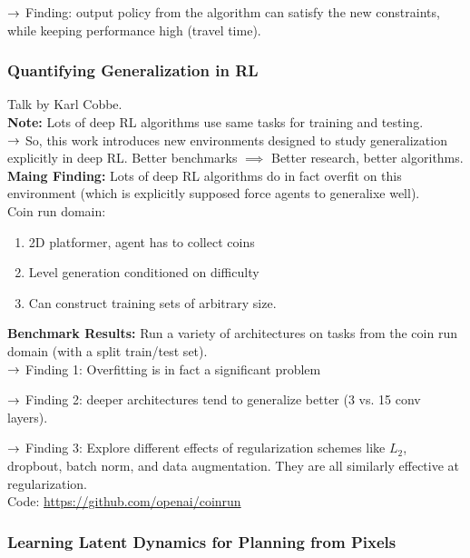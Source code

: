 $\rightarrow$ Finding: output policy from the algorithm can satisfy the new constraints, while keeping performance high (travel time).

\spacerule


\subsubsection{Quantifying Generalization in RL~\cite{cobbe2018quantifying}}

Talk by Karl Cobbe. \\

{\bf Note:} Lots of deep RL algorithms use same tasks for training and testing. \\

$\rightarrow$ So, this work introduces new environments designed to study generalization explicitly in deep RL. Better benchmarks $\implies$ Better research, better algorithms. \\

{\bf Maing Finding:} Lots of deep RL algorithms do in fact overfit on this environment (which is explicitly supposed force agents to generalixe well). \\

Coin run domain:
\begin{enumerate}
    \item 2D platformer, agent has to collect coins
    \item Level generation conditioned on difficulty
    \item Can construct training sets of arbitrary size.
\end{enumerate}

{\bf Benchmark Results:} Run a variety of architectures on tasks from the coin run domain (with a split train/test set). \\

$\rightarrow$ Finding 1: Overfitting is in fact a significant problem

$\rightarrow$ Finding 2: deeper architectures tend to generalize better (3 vs. 15 conv layers).

$\rightarrow$ Finding 3: Explore different effects of regularization schemes like $L_2$, dropbout, batch norm, and data augmentation. They are all similarly effective at regularization. \\

Code: \url{https://github.com/openai/coinrun}

\spacerule

\subsubsection{Learning Latent Dynamics for Planning from Pixels~\cite{hafner2018learning}}

